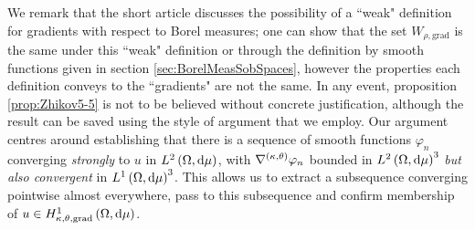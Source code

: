 We remark that the short article \cite{zhikov2005note} discusses the possibility of a ``weak" definition for gradients with respect to Borel measures; one can show that the set $W_{\rho,\mathrm{grad}}$ is the same under this ``weak" definition or through the definition by smooth functions given in section \ref{sec:BorelMeasSobSpaces}, however the properties each definition conveys to the ``gradients" are not the same.
In any event, proposition \ref{prop:Zhikov5-5} is not to be believed without concrete justification, although the result \cite[lemma 6.1]{zhikov2002homogenization} can be saved using the style of argument that we employ.
Our argument centres around establishing that there is a sequence of smooth functions $\varphi_n$ converging \emph{strongly} to $u$ in $L^{2}\left( \Omega,\mathrm{d} \mu \right)$, with $\nabla^{\left( \kappa, \theta \right)}\varphi_n$ bounded in $L^{2}\left( \Omega,\mathrm{d} \mu \right)^3$ \emph{but also convergent} in $L^1\left( \Omega,\mathrm{d}\mu \right)^3$.
This allows us to extract a subsequence converging pointwise almost everywhere, pass to this subsequence and confirm membership of $u\in H^1_{\kappa,\theta,\mathrm{grad}}\left( \Omega, \mathrm{d}\mu \right)$.

